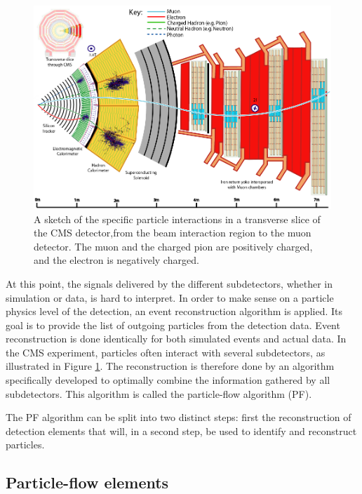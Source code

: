 \begin{figure}
    \centering
    \includegraphics[width=\textwidth]{Images/pflow_illustration_2.png}
    \caption{A sketch of the specific particle interactions in a transverse slice of the CMS detector,from the beam interaction region to the muon detector.  The muon and the charged pion are positively charged, and the electron is negatively charged.}
    \label{fig:pflow_illustration}
\end{figure}

At this point, the signals delivered by the different subdetectors, whether in simulation or data, is hard to interpret. In order to make sense on a particle physics level of the detection, an event reconstruction algorithm is applied. Its goal is to provide the list of outgoing particles from the detection data. Event reconstruction is done identically for both simulated events and actual data. In the CMS experiment, particles often interact with several subdetectors, as illustrated in Figure \ref{fig:pflow_illustration}. The reconstruction is therefore done by an algorithm specifically developed to optimally combine the information gathered by all subdetectors. This algorithm is called the particle-flow algorithm (PF). 

\label{sec:pf}

The PF algorithm can be split into two distinct steps: first the reconstruction of detection elements that will, in a second step, be used to identify and reconstruct particles.

\subsection{Particle-flow elements}

